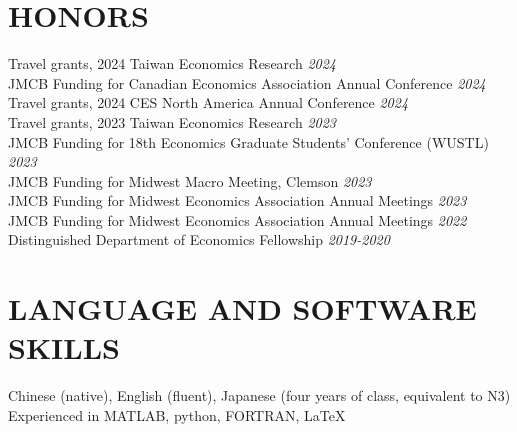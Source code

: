\documentclass[11pt]{res} %
\begin{document}
\begin{resume}
\section{HONORS}
\vspace{8pt} %
Travel grants, 2024 Taiwan Economics Research \hfill \textit{2024} \\
JMCB Funding for Canadian Economics Association Annual Conference \hfill \textit{2024} \\
Travel grants, 2024 CES North America Annual Conference \hfill \textit{2024} \\
Travel grants, 2023 Taiwan Economics Research \hfill \textit{2023} \\
JMCB Funding for 18th Economics Graduate Students' Conference (WUSTL) \hfill \textit{2023} \\
JMCB Funding for Midwest Macro Meeting, Clemson \hfill \textit{2023} \\
JMCB Funding for Midwest Economics Association Annual Meetings \hfill \textit{2023} \\
JMCB Funding for Midwest Economics Association Annual Meetings \hfill \textit{2022} \\
Distinguished Department of Economics Fellowship \hfill  \textit{2019-2020}


\section{LANGUAGE AND SOFTWARE SKILLS}
\vspace{8pt} %
Chinese (native), English (fluent), Japanese (four years of class, equivalent to N3) \\
Experienced in MATLAB, python, FORTRAN, \LaTeX{}


\end{resume}
\end{document}
